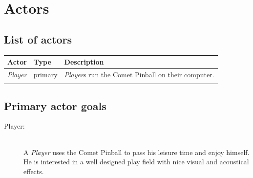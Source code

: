 \documentclass[fontsize=12pt,
               paper=a4,
               twoside=false,
               parskip=half,
               ]{scrartcl}
\begin{document}
\newcommand{\doctitle}{Use Case Model}


\tableofcontents


\section{Actors}

\subsection{List of actors}

\begin{tabular}{llp{9cm}}
\toprule
\textbf{Actor} & \textbf{Type} & \textbf{Description} \\ 
\midrule
\emph{Player} & primary & \emph{Player}s run the Comet Pinball on their computer.\\

\\ 
\bottomrule 
\end{tabular} 

\subsection{Primary actor goals}

\begin{description}

\item[Player:] \hfill \\
A \emph{Player} uses the Comet Pinball to pass his leisure time and enjoy himself. He is interested in a well designed play field with nice visual and acoustical effects.


\end{description}
\end{document}

